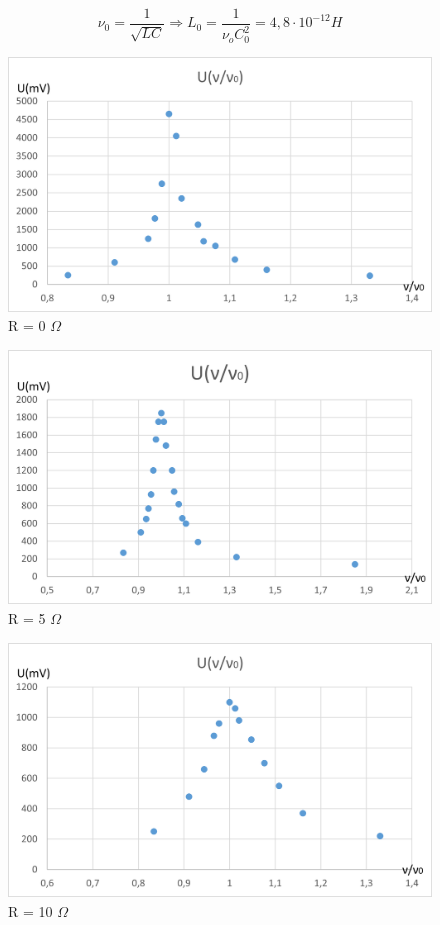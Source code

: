 \documentclass[a4paper]{report}
\begin{document}
\[\nu_0 = \frac{1}{\sqrt{LC}}\Rightarrow L_0=\frac{1}{\nu_o C_0^2}=4,8\cdot10^{-12}H\]

\begin{figure}[htp]
    \centering
    \includegraphics[width=\textwidth]{R = 0.png}
    \caption{R = 0 $\Omega$}
    \label{fig:galaxy}
\end{figure}

\begin{figure}[htp]
    \centering
    \includegraphics[width=\textwidth]{R = 5.png}
    \caption{R = 5 $\Omega$}
    \label{fig:galaxy}
\end{figure}

\begin{figure}[htp]
    \centering
    \includegraphics[width=\textwidth]{R = 10.png}
    \caption{R = 10 $\Omega$}
    \label{fig:galaxy}
\end{figure}
\end{document}
